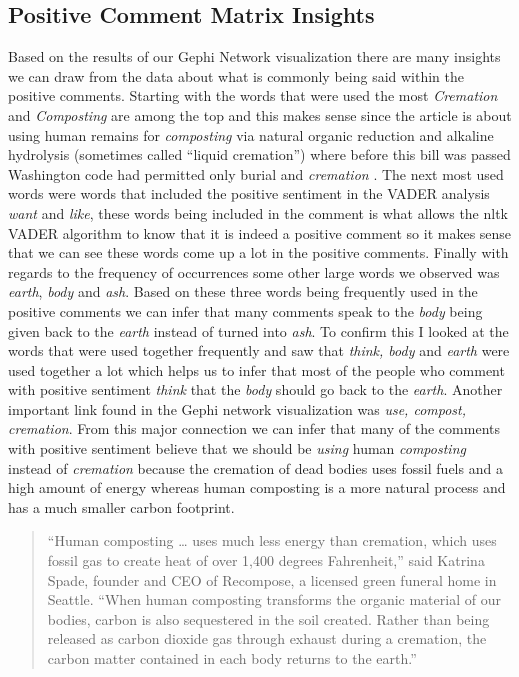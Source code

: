 \documentclass{article}
\begin{document}
\subsection{Positive Comment Matrix Insights}

Based on the results of our Gephi Network visualization there are many insights we can draw from the data about what is commonly being said within the positive comments. Starting with the words that were used the most \emph{Cremation} and \emph{Composting} are among the top and this makes sense since the article is about using human remains for \emph{composting} via natural organic reduction and alkaline hydrolysis (sometimes called “liquid cremation”) where before this bill was passed Washington code had permitted only burial and \emph{cremation} \parencite[]{Kiley_2019}. The next most used words were words that included the positive sentiment in the VADER analysis \emph{want} and \emph{like}, these words being included in the comment is what allows the nltk VADER algorithm to know that it is indeed a positive comment so it makes sense that we can see these words come up a lot in the positive comments. Finally with regards to the frequency of occurrences some other large words we observed was \emph{earth}, \emph{body} and \emph{ash}. Based on these three words being frequently used in the positive comments we can infer that many comments speak to the \emph{body} being given back to the \emph{earth} instead of turned into \emph{ash}. To confirm this I looked at the words that were used together frequently and saw that \emph{think, body} and \emph{earth} were used together a lot which helps us to infer that most of the people who comment with positive sentiment \emph{think} that the \emph{body} should go back to the \emph{earth}. Another important link found in the Gephi network visualization was \emph{use, compost, cremation}. From this major connection we can infer that many of the comments with positive sentiment believe that we should be \emph{using} human \emph{composting} instead of \emph{cremation} because the cremation of dead bodies uses fossil fuels and a high amount of energy whereas human composting is a more natural process and has a much smaller carbon footprint. 
\begin{quote}
    “Human composting … uses much less energy than cremation, which uses fossil gas to create heat of over 1,400 degrees Fahrenheit,” said Katrina Spade, founder and CEO of Recompose, a licensed green funeral home in Seattle. “When human composting transforms the organic material of our bodies, carbon is also sequestered in the soil created. Rather than being released as carbon dioxide gas through exhaust during a cremation, the carbon matter contained in each body returns to the earth.” \parencite{Rogers_2022}
\end{quote}
\end{document}
